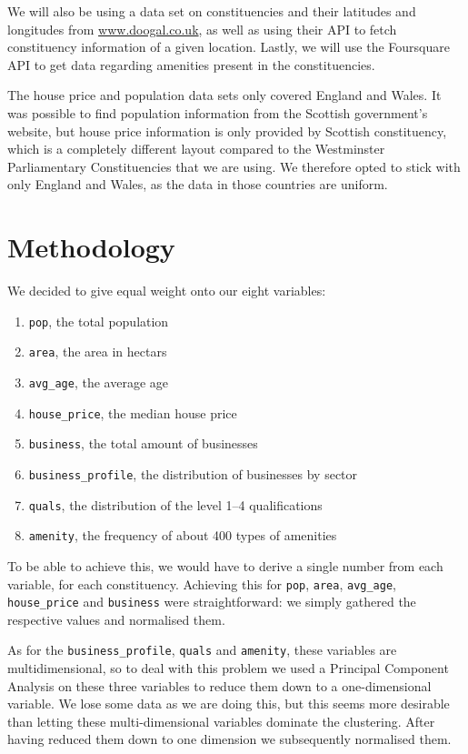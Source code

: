 \documentclass[a4paper, 11pt]{article}
\begin{document}
We will also be using a data set on constituencies and their latitudes and longitudes from \url{www.doogal.co.uk}, as well as using their API to fetch constituency information of a given location. Lastly, we will use the Foursquare API to get data regarding amenities present in the constituencies.

The house price and population data sets only covered England and Wales. It was possible to find population information from the Scottish government's website, but house price information is only provided by Scottish constituency, which is a completely different layout compared to the Westminster Parliamentary Constituencies that we are using. We therefore opted to stick with only England and Wales, as the data in those countries are uniform.
 

\section{Methodology}
We decided to give equal weight onto our eight variables:
\begin{enumerate}
  \item {\tt pop}, the total population
  \item {\tt area}, the area in hectars
  \item {\tt avg\_age}, the average age
  \item {\tt house\_price}, the median house price
  \item {\tt business}, the total amount of businesses
  \item {\tt business\_profile}, the distribution of businesses by sector
  \item {\tt quals}, the distribution of the level 1--4 qualifications
  \item {\tt amenity}, the frequency of about 400 types of amenities\\
\end{enumerate}

To be able to achieve this, we would have to derive a single number from each variable, for each constituency. Achieving this for {\tt pop}, {\tt area}, {\tt avg\_age}, {\tt house\_price} and {\tt business} were straightforward: we simply gathered the respective values and normalised them.

As for the {\tt business\_profile}, {\tt quals} and {\tt amenity}, these variables are multidimensional, so to deal with this problem we used a Principal Component Analysis on these three variables to reduce them down to a one-dimensional variable. We lose some data as we are doing this, but this seems more desirable than letting these multi-dimensional variables dominate the clustering. After having reduced them down to one dimension we subsequently normalised them.
\end{document}

